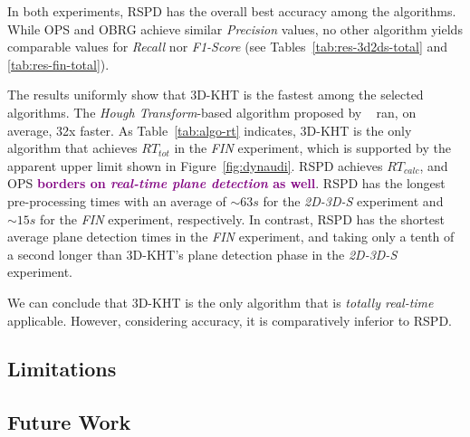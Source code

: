 \documentclass[main.tex]{subfiles}
\begin{document}

In both experiments, RSPD has the overall best accuracy among the algorithms. While OPS and OBRG achieve similar \textit{Precision} values, no other algorithm yields comparable values for \textit{Recall} nor \textit{F1-Score} (see Tables~\ref{tab:res-3d2ds-total} and \ref{tab:res-fin-total}).

The results uniformly show that 3D-KHT is the fastest among the selected algorithms. The \textit{Hough Transform}-based algorithm proposed by \citeauthor{LimbergerOliveira2015HT3D}~\cite{LimbergerOliveira2015HT3D} ran, on average, 32x faster. As Table~\ref{tab:algo-rt} indicates, 3D-KHT is the only algorithm that achieves $RT_{tot}$ in the \textit{FIN} experiment, which is supported by the apparent upper limit shown in Figure~\ref{fig:dynaudi}. RSPD achieves $RT_{calc}$, and OPS \textbf{\textcolor{purple}{borders on \textit{real-time plane detection} as well}}. RSPD has the longest pre-processing times with an average of ${\sim}63s$ for the \textit{2D-3D-S} experiment and ${\sim}15s$ for the \textit{FIN} experiment, respectively. In contrast, RSPD has the shortest average plane detection times in the \textit{FIN} experiment, and taking only a tenth of a second longer than 3D-KHT's plane detection phase in the \textit{2D-3D-S} experiment.

We can conclude that 3D-KHT is the only algorithm that is \textit{totally real-time} applicable. However, considering accuracy, it is comparatively inferior to RSPD. 

\subsection{Limitations}


\subsection{Future Work}
\end{document}
